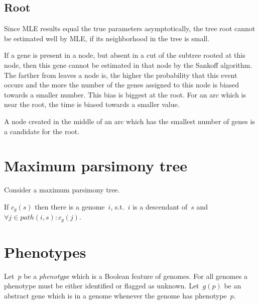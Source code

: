 \documentclass[10pt,a4paper]{article}
\theoremstyle{plain} \newtheorem{Lem}{Lemma}
\begin{document}
\subsection {Root}
Since MLE results equal the true parameters asymptotically, 
the tree root cannot be estimated well by MLE, if its neighborhood in the tree is small.

If a gene is present in a node, but absent in a cut of the subtree rooted at this node, then this gene cannot be estimated in that node by the Sankoff algorithm.
The farther from leaves a node is, 
the higher the probability that this event occurs
and the more the number of the genes assigned to this node is biased towards a smaller number.
This bias is biggest at the root.
For an arc which is near the root, the time is biased towards a smaller value.

A node created in the middle of an arc which has the smallest number of genes is a candidate for the root.


\section{Maximum parsimony tree}

Consider a maximum parsimony tree.

If $c_g(s)$ then there is a genome~$i$, s.t.~$i$ is a descendant of~$s$ and $\forall j \in path(i,s) : c_g(j)$.




\section{Phenotypes}
Let~$p$ be a {\em phenotype} which is a Boolean feature of genomes.
For all genomes a phenotype must be either identified or flagged as unknown.
Let~$g(p)$ be an abstract gene which is in a genome whenever the genome has phenotype~$p$.
\end{document}
